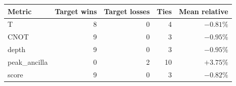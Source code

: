 \begin{tabular}{lrrrr}
\toprule
Metric & Target wins & Target losses & Ties & Mean relative \\
\midrule
T & 8 & 0 & 4 & $-0.81\%$ \\
CNOT & 9 & 0 & 3 & $-0.95\%$ \\
depth & 9 & 0 & 3 & $-0.95\%$ \\
peak_ancilla & 0 & 2 & 10 & $+3.75\%$ \\
score & 9 & 0 & 3 & $-0.82\%$ \\
\bottomrule
\end{tabular}
